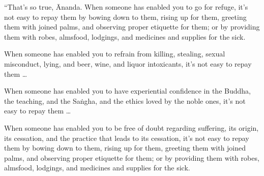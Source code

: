 \documentclass[12pt,openany]{book}%
\begin{document}
“That’s so true, Ānanda. When someone has enabled you to go for refuge, it’s not easy to repay them by bowing down to them, rising up for them, greeting them with joined palms, and observing proper etiquette for them; or by providing them with robes, almsfood, lodgings, and medicines and supplies for the sick. 

When someone has enabled you to refrain from killing, stealing, sexual misconduct, lying, and beer, wine, and liquor intoxicants, it’s not easy to repay them … 

When someone has enabled you to have experiential confidence in the Buddha, the teaching, and the \textsanskrit{Saṅgha}, and the ethics loved by the noble ones, it’s not easy to repay them … 

When someone has enabled you to be free of doubt regarding suffering, its origin, its cessation, and the practice that leads to its cessation, it’s not easy to repay them by bowing down to them, rising up for them, greeting them with joined palms, and observing proper etiquette for them; or by providing them with robes, almsfood, lodgings, and medicines and supplies for the sick. 
\end{document}
